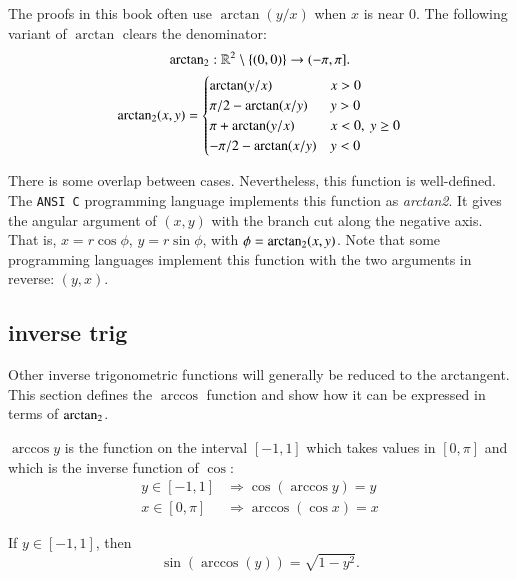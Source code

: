 The proofs in this book often use $\arctan(y/x)$ when $x$ is near $0$.
The following variant of $\arctan$ clears the denominator:
$$
{\operatorname{arctan_2}}: \mathbb{R}^2\setminus\{(0,0)\} \to (-\pi,\pi].
$$
$$
{\operatorname{arctan_2}}(x,y) = \begin{cases}
   \arctan(y/x) & x > 0\\
   \pi/2- \arctan(x/y) & y > 0 \\
   \pi + \arctan(y/x) & x< 0,\  y\ge 0\\
   -\pi/2- \arctan(x/y) & y< 0 \\
\end{cases}
$$
%
%


There is some overlap between cases. Nevertheless, 
this function is well-defined.  
The {\tt ANSI C} programming language implements this function as {\it arctan2}.  It gives the
angular argument of $(x,y)$ with the branch cut along the negative axis.
That is, $x = r\cos\phi$, $y=r\sin\phi$, with $\phi={\operatorname{arctan_2}}(x,y)$.
Note that some programming languages implement this function with the two arguments in reverse: $(y,x)$.
%
%
%
%


\subsection{inverse trig}
%
Other inverse trigonometric functions will generally be reduced to
the arctangent.  This section defines the $\arccos$ function and show how it can be expressed in terms of ${\operatorname{arctan_2}}$.

\begin{definition}[arccos]\label{def:arccos}
$\arccos y$ is the function on the interval $[-1,1]$ which takes
values in $[0,\pi]$ and which is the inverse function of $\cos$:
    $$\begin{array}{lll}
        y\in [-1,1] &\Rightarrow \cos(\arccos y) = y\\
        x\in[0,\pi] &\Rightarrow \arccos(\cos x) = x
    \end{array}$$
%
%
\end{definition}

\begin{lemma}\label{lemma:sin-arccos} 
If $y\in[-1,1]$, then
    $$\sin(\arccos(y)) = \sqrt{1-y^2}.$$
\end{lemma}

